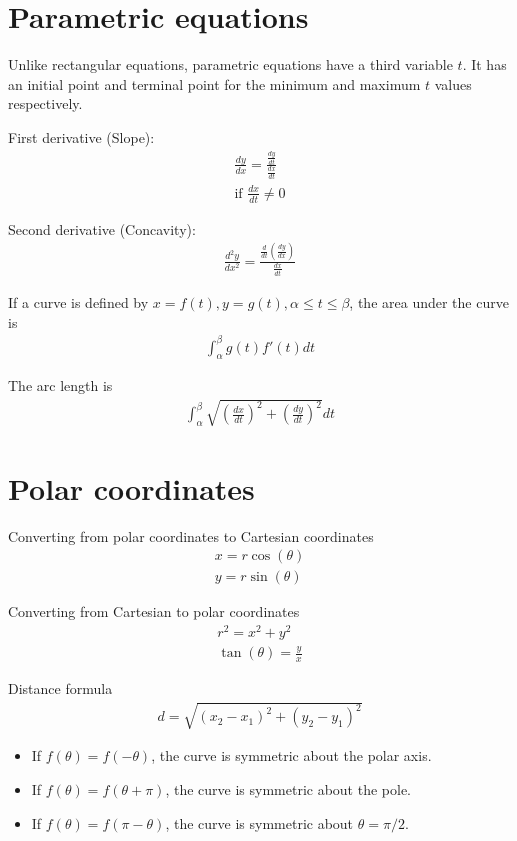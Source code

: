 \documentclass{article}
\begin{document}
\section{Parametric equations}
Unlike rectangular equations, parametric equations have a third variable $t$.
It has an initial point and terminal point for the minimum and maximum $t$ values respectively.

First derivative (Slope):
\begin{gather*}
    \frac{dy}{dx} = \frac{\frac{dy}{dt}}{\frac{dx}{dt}} \\
    \text{if }\frac{dx}{dt} \neq 0
\end{gather*}

Second derivative (Concavity):
\begin{gather*}
    \frac{d^2 y}{dx^2} = \frac{\frac{d}{dt}\left( \frac{dy}{dx} \right)}{\frac{dx}{dt}}
\end{gather*}

If a curve is defined by $x = f(t), y = g(t), \alpha \leq t \leq \beta$, the area under the curve is
\begin{gather*}
    \int_\alpha^\beta g(t) f'(t) dt
\end{gather*}

The arc length is
\begin{gather*}
    \int_\alpha^\beta \sqrt{\left(\frac{dx}{dt}\right)^2 + \left(\frac{dy}{dt}\right)^2} dt
\end{gather*}

\section{Polar coordinates}

Converting from polar coordinates to Cartesian coordinates
\begin{gather*}
    x = r \cos(\theta) \\
    y = r \sin(\theta)
\end{gather*}

Converting from Cartesian to polar coordinates
\begin{gather*}
    r^2 = x^2 + y^2 \\
    \tan(\theta) = \frac{y}{x}
\end{gather*}

Distance formula
\begin{gather*}
    d = \sqrt{(x_2 - x_1)^2 + (y_2 - y_1)^2}
\end{gather*}

\begin{itemize}
    \item If $f(\theta) = f(-\theta)$, the curve is symmetric about the polar axis. \\
    \item If $f(\theta) = f(\theta + \pi)$, the curve is symmetric about the pole. \\
    \item If $f(\theta) = f(\pi - \theta)$, the curve is symmetric about $\theta = \pi / 2$.
\end{itemize}
\end{document}
